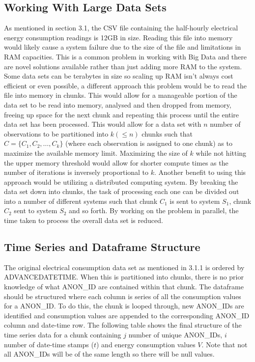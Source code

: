     \subsection{Working With Large Data Sets}
    As mentioned in section 3.1, the CSV file containing the half-hourly electrical energy consumption readings is 12GB in size. Reading this file into memory would likely cause a system failure due to the size of the file and limitations in RAM capacities. This is a common problem in working with Big Data and there are novel solutions available rather than just adding more RAM to the system. Some data sets can be terabytes in size so scaling up RAM isn't always cost efficient or even possible, a different approach this problem would be to read the file into memory in chunks. This would allow for a manageable portion of the data set to be read into memory, analysed and then dropped from memory, freeing up space for the next chunk and repeating this process until the entire data set has been processed. This would allow for a data set with $n$ number of observations to be partitioned into $k(\leq n)$ chunks such that $C = \{C_1, C_2, \dots, C_k\}$ (where each observation is assigned to one chunk) as to maximize the available memory limit. Maximizing the size of $k$ while not hitting the upper memory threshold would allow for shorter compute times as the number of iterations is inversely proportional to $k$. Another benefit to using this approach would be utilizing a distributed computing system. By breaking the data set down into chunks, the task of processing each one can be divided out into a number of different systems such that chunk $C_1$ is sent to system $S_1$, chunk $C_2$ sent to system $S_2$ and so forth. By working on the problem in parallel, the time taken to process the overall data set is reduced.
    
    \subsection{Time Series and Dataframe Structure}
    The original electrical consumption data set as mentioned in 3.1.1 is ordered by ADVANCEDATETIME. When this is partitioned into chunks, there is no prior knowledge of what ANON\_ID are contained within that chunk. The dataframe should be structured where each column is series of all the consumption values for a ANON\_ID. To do this, the chunk is looped through, new ANON\_IDs are identified and consumption values are appended to the corresponding ANON\_ID column and date-time row. The following table shows the final structure of the time series data for a chunk containing $j$ number of unique ANON\_IDs, $i$ number of date-time stamps ($t$) and energy consumption values $V$. Note that not all ANON\_IDs will be of the same length so there will be null values.

